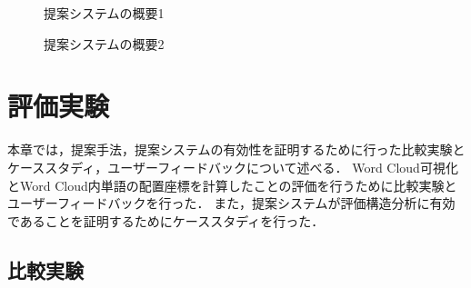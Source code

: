 \documentclass[syuuron]{kuee}
\begin{document}
		\begin{figure}
			\begin{center}
			\end{center}
			\caption{提案システムの概要1}
	  		\label{fig:sys1}
		\end{figure}
		\begin{figure}
			\begin{center}
			\end{center}
			\caption{提案システムの概要2}
	  		\label{fig:sys2}
		\end{figure}

\chapter{評価実験}
	本章では，提案手法，提案システムの有効性を証明するために行った比較実験とケーススタディ，ユーザーフィードバックについて述べる．
	Word Cloud可視化とWord Cloud内単語の配置座標を計算したことの評価を行うために比較実験とユーザーフィードバックを行った．
	また，提案システムが評価構造分析に有効であることを証明するためにケーススタディを行った．
	\section{比較実験}
\end{document}
